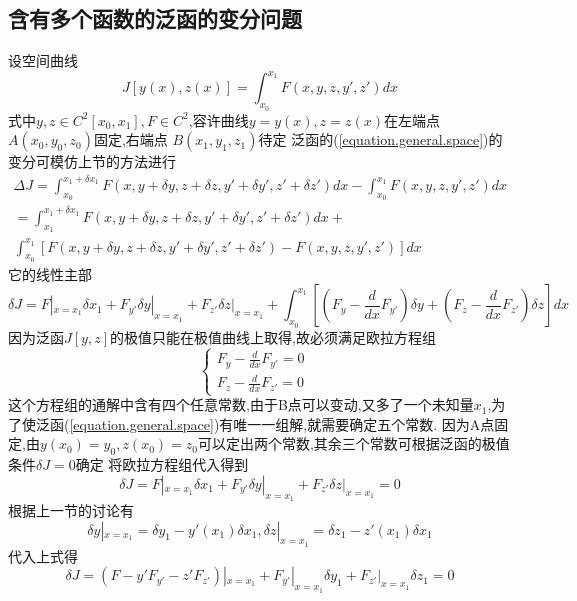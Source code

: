 \documentclass{book}
\begin{document}
\subsection{含有多个函数的泛函的变分问题}
设空间曲线
\begin{equation}
J[y(x),z(x)]=\int_{x_0}^{x_1}F(x,y,z,y',z')dx
\label{equation.general.space}
\end{equation}
式中$y,z \in C^2[x_0,x_1],F \in C^2$,容许曲线$y=y(x),z=z(x)$在左端点
$A(x_0,y_0,z_0)$固定,右端点 $B(x_1,y_1,z_1)$待定
泛函的(\ref{equation.general.space})的变分可模仿上节的方法进行
\begin{equation}
\begin{array}{c}
  \Delta J=\int_{x_0}^{x_1+\delta x_1}F(x,y+\delta y,z+\delta z,y'+\delta y',z'+\delta z')dx-\int_{x_0}^{x_1}F(x,y,z,y',z')dx\\
  = \int_{x_1}^{x_1+\delta x_1}F(x,y+\delta y,z+\delta z,y'+\delta y',z'+\delta z')dx +\\
\int_{x_0}^{x_1}[F(x,y+\delta y,z+\delta z,y'+\delta y',z'+\delta z')-F(x,y,z,y',z')]dx
\end{array}
\end{equation}
它的线性主部
\begin{equation}
 \delta J=F|_{x=x_1}\delta x_1 +F_{y'}\delta y|_{x=x_1} +F_{z'}\delta z|_{x=x_1} +
 \int_{x_0}^{x_1}[(F_y - \frac{d}{dx}F_{y'}) \delta y +(F_z -\frac{d}{dx}F_{z'} )\delta z]dx
\end{equation}
因为泛函$J[y,z]$的极值只能在极值曲线上取得,故必须满足欧拉方程组
$$
\left\{
  \begin{array}{ll}
    F_y - \frac{d}{dx}F_{y'}=0 & \\
    F_z - \frac{d}{dx}F_{z'}=0 &
  \end{array}
\right.
$$
这个方程组的通解中含有四个任意常数,由于B点可以变动,又多了一个未知量$x_1$,为了使泛函(\ref{equation.general.space})有唯一一组解,就需要确定五个常数.
因为A点固定,由$y(x_0)=y_0,z(x_0)=z_0$可以定出两个常数,其余三个常数可根据泛函的极值条件$\delta J=0$确定
将欧拉方程组代入得到
\begin{equation}
 \delta J=F|_{x=x_1}\delta x_1 +F_{y'}\delta y|_{x=x_1} +F_{z'}\delta z|_{x=x_1}=0
\end{equation}
根据上一节的讨论有
\begin{equation}
 \delta y|_{x=x_1}=\delta y_1 - y'(x_1)\delta x_1, \delta z|_{x=x_1}=\delta z_1 - z'(x_1)\delta x_1
\end{equation}
代入上式得
\begin{equation}
 \delta J=(F - y'F_{y'} - z'F_{z'})|_{x=x_1} + F_{y'}|_{x=x_1}\delta y_1 + F_{z'}|_{x=x_1}\delta z_1=0
\label{equation.cases}
\end{equation}
\end{document}
